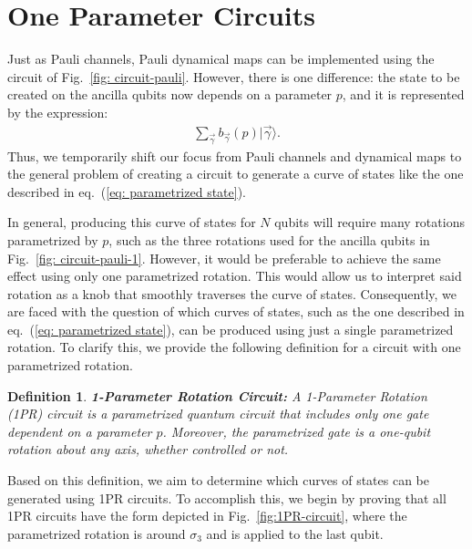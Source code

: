 \documentclass[10pt,letterpaper]{article} %
\newcommand{\fref}[1]{Fig.~\ref{#1}}
\newcommand{\eref}[1]{eq.~(\ref{#1})}
\newtheorem{definition}{Definition}
\begin{document}
\section{One Parameter Circuits} %
\label{sec: 1PR Circuits}


Just as Pauli channels, Pauli dynamical maps can be implemented using the circuit
of \fref{fig: circuit-pauli}. However, there is one difference: 
the state to be created on the ancilla qubits now 
depends on a parameter $p$, and it is represented by the expression:
\begin{eqnarray}
\label{eq: parametrized state}
\sum_{\vec{\gamma}} b_{\vec{\gamma}}(p) |\vec{\gamma}\rangle.
\end{eqnarray}
Thus, we temporarily shift our focus from Pauli
channels and dynamical maps to the general problem of 
creating a circuit to generate a curve of
states like the one described in \eref{eq: parametrized state}.

In general, producing this curve of states for $N$ qubits will require
many rotations parametrized by $p$,
such as the three rotations used for the ancilla
qubits in \fref{fig: circuit-pauli-1}.
However, it would be preferable to achieve the same effect using only one parametrized rotation. 
This would allow us to interpret said rotation 
as a knob that smoothly traverses the curve of states.
Consequently, we are faced with the question of which curves of states, 
such as the one described in \eref{eq: parametrized state}, 
can be produced using just a single parametrized rotation. 
To clarify this, we provide the following definition 
for a circuit with one parametrized rotation.

\begin{definition}{\textbf{1-Parameter Rotation Circuit:}}
A 1-Parameter Rotation (1PR) circuit is a parametrized quantum
circuit that includes only one gate dependent on a parameter $p$.
Moreover, the parametrized gate is a one-qubit rotation about any axis,
whether controlled or not.
\end{definition}

Based on this definition, we aim to determine which curves of 
states can be generated using 1PR circuits. 
To accomplish this, we begin by proving that all 1PR circuits have 
the form depicted in \fref{fig:1PR-circuit},
where the parametrized rotation is around $\sigma_3$ and
is applied to the last qubit.
\end{document}
